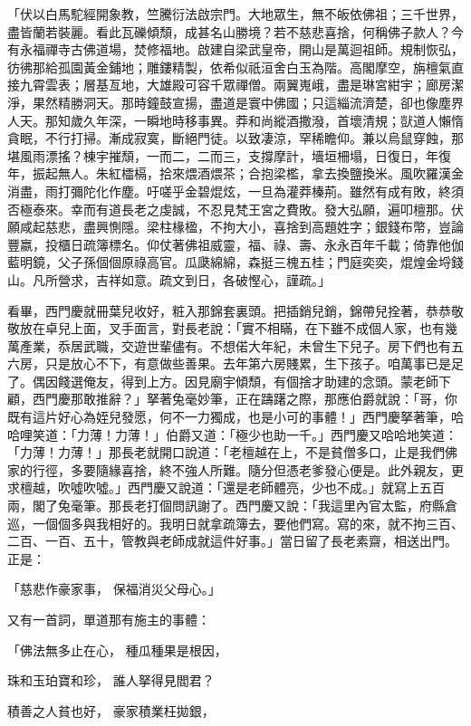 \begin{showcontents}{}
「伏以白馬駝經開象教，竺騰衍法啟宗門。大地眾生，無不皈依佛祖；三千世界，盡皆蘭若裝麗。看此瓦礫傾頹，成甚名山勝境？若不慈悲喜捨，何稱佛子款人？今有永福禪寺古佛道場，焚修福地。啟建自梁武皇帝，開山是萬迴祖師。規制恢弘，彷彿那給孤園黃金鋪地；雕鏤精製，依希似祇洹舍白玉為階。高閣摩空，旃檀氣直接九霄雲表；層基亙地，大雄殿可容千眾禪僧。兩翼嵬峨，盡是琳宮紺宇；廊房潔淨，果然精勝洞天。那時鐘鼓宣揚，盡道是寰中佛國；只這緇流濟楚，卻也像塵界人天。那知歲久年深，一瞬地時移事異。莽和尚縱酒撒潑，首壞清規；獃道人懶惰貪眠，不行打掃。漸成寂寞，斷絕門徒。以致凄涼，罕稀瞻仰。兼以烏鼠穿蝕，那堪風雨漂搖？棟宇摧頹，一而二，二而三，支撐摩計，墻垣柵塌，日復日，年復年，振起無人。朱紅櫺槅，拾來煨酒煨茶；合抱梁檻，拿去換鹽換米。風吹羅漢金消盡，雨打彌陀化作塵。吁嗟乎金碧焜炫，一旦為灌莽榛荊。雖然有成有敗，終須否極泰來。幸而有道長老之虔誠，不忍見梵王宮之費敗。發大弘願，遍叩檀那。伏願咸起慈悲，盡興惻隱。梁柱椽楹，不拘大小，喜捨到高題姓字；銀錢布幣，豈論豐嬴，投櫃日疏簿標名。仰仗著佛祖威靈，福、祿、壽、永永百年千載；倚靠他伽藍明鏡，父子孫個個原祿高官。瓜瓞綿綿，森挺三槐五桂；門庭奕奕，焜煌金埒錢山。凡所營求，吉祥如意。疏文到日，各破慳心，謹疏。」

看畢，西門慶就冊葉兒收好，粧入那錦套裏頭。把插銷兒銷，錦帶兒拴著，恭恭敬敬放在卓兒上面，叉手面言，對長老說：「實不相瞞，在下雖不成個人家，也有幾萬產業，忝居武職，交遊世輩儘有。不想偌大年紀，未曾生下兒子。房下們也有五六房，只是放心不下，有意做些善果。去年第六房賤累，生下孩子。咱萬事已是足了。偶因餞選俺友，得到上方。因見廟宇傾頹，有個捨才助建的念頭。蒙老師下顧，西門慶那敢推辭？」拏著兔毫妙筆，正在躊躇之際，那應伯爵就說：「哥，你既有這片好心為姪兒發愿，何不一力獨成，也是小可的事體！」西門慶拏著筆，哈哈哩笑道：「力薄！力薄！」伯爵又道：「極少也助一千。」西門慶又哈哈地笑道：「力薄！力薄！」那長老就開口說道：「老檀越在上，不是貧僧多口，止是我們佛家的行徑，多要隨緣喜捨，終不強人所難。隨分但憑老爹發心便是。此外親友，更求檀越，吹噓吹噓。」西門慶又說道：「還是老師體亮，少也不成。」就寫上五百兩，閣了兔毫筆。那長老打個問訊謝了。西門慶又說：「我這里內官太監，府縣倉巡，一個個多與我相好的。我明日就拿疏簿去，要他們寫。寫的來，就不拘三百、二百、一百、五十，管教與老師成就這件好事。」當日留了長老素齋，相送出門。正是：

「慈悲作豪家事，  保福消災父母心。」

又有一首詞，單道那有施主的事體：

「佛法無多止在心，  種瓜種果是根因，

珠和玉珀寶和珍，  誰人拏得見閻君？

積善之人貧也好，  豪家積業枉拋銀，


\end{showcontents}

